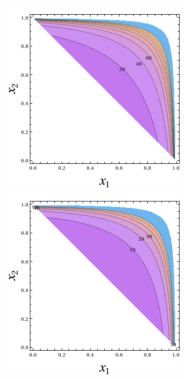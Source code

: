 \begin{figure}[h!]
\begin{center}
\begin{minipage}{0.45\linewidth}
\end{minipage}
\end{center}
\begin{center}
\begin{minipage}{0.45\linewidth}
\includegraphics[width=\linewidth]{images/ms1undsw.png}
\end{minipage}
\hfill
\begin{minipage}{0.45\linewidth}
\includegraphics[width=\linewidth]{images/ann.png}

\end{minipage}
\end{center}
\end{figure}
